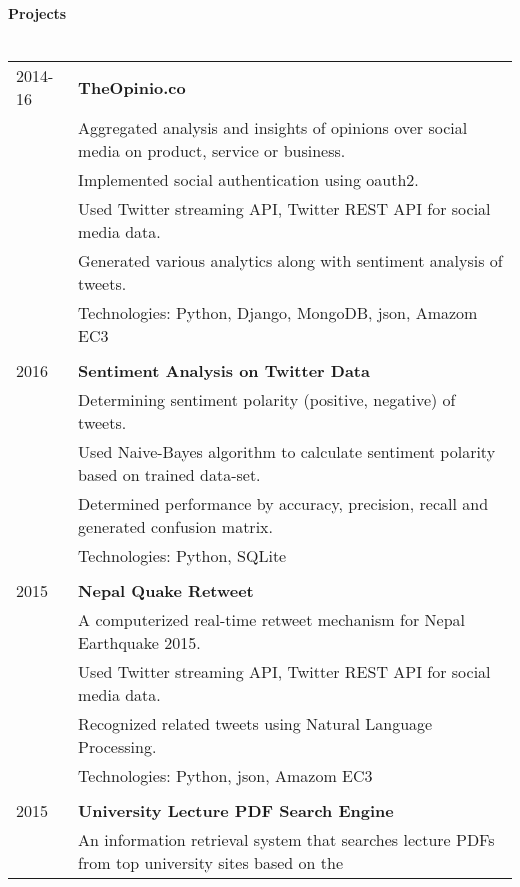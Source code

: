 \documentclass[letterpaper,10pt,oneside]{article}
\newcommand{\nextitem}{\par\hspace*{\labelsep}\textbullet\hspace*{\labelsep}}
\begin{document}
\paragraph{\large{Projects}\\\\}
\noindent \begin{tabular}{l l}
 2014-16 & \textbf{TheOpinio.co} \\
         & Aggregated analysis and insights of opinions over social media on product, service or business. \\
         & \footnotesize{\nextitem  Implemented social authentication using oauth2.} \\
         & \footnotesize{\nextitem  Used Twitter streaming API, Twitter REST API for social media data.} \\
         & \footnotesize{\nextitem  Generated various analytics along with sentiment analysis of tweets.} \\
         & Technologies: Python, Django, MongoDB, json, Amazom EC3 \\
         \\
 2016    & \textbf{Sentiment Analysis on Twitter Data} \\
         & Determining sentiment polarity (positive, negative) of tweets. \\
         & \footnotesize{\nextitem Used Naive-Bayes algorithm to calculate sentiment polarity based on trained data-set.} \\
         & \footnotesize{\nextitem Determined performance by accuracy, precision, recall and generated confusion matrix.} \\
         & Technologies: Python, SQLite \\
         \\
 2015    & \textbf{Nepal Quake Retweet} \\
         & A computerized real-time retweet mechanism for Nepal Earthquake 2015. \\
         & \footnotesize{\nextitem  Used Twitter streaming API, Twitter REST API for social media data.} \\
         & \footnotesize{\nextitem Recognized related tweets using Natural Language Processing.} \\
         & Technologies: Python, json, Amazom EC3 \\
         \\
 2015    & \textbf{University Lecture PDF Search Engine} \\
         & An information retrieval system that searches lecture PDFs from top university sites based on the \\

\end{tabular}
\end{document}
